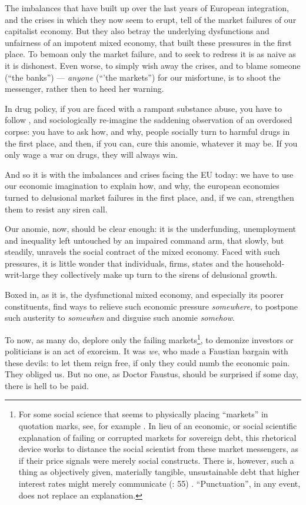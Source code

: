 \documentclass[11pt,a4paper,oneside,openright]{article}
\begin{document}
The imbalances that have built up over the last years of European integration, and the crises in which they now seem to erupt, tell of the market failures of our capitalist economy. But they also betray the underlying dysfunctions and unfairness of an impotent mixed economy, that built these pressures in the first place. To bemoan only the market failure, and to seek to redress it is as naive as it is dishonest. Even worse, to simply wish away the crises, and to blame someone (``the banks'') --- \emph{anyone} (``'the markets'') for our misfortune, is to shoot the messenger, rather then to heed her warning.

In drug policy, if you are faced with a rampant substance abuse, you have to follow \cite{Mills-1959-aa}, and sociologically re-imagine the saddening observation of an overdosed corpse: you have to ask how, and why, people socially turn to harmful drugs in the first place, and then, if you can, cure this anomie, whatever it may be. If you only wage a war on drugs, they will always win.

And so it is with the imbalances and crises facing the \gls{EU} today: we have to use our economic imagination to explain how, and why, the european economies turned to delusional market failures in the first place, and, if we can, strengthen them to resist any siren call. 

Our anomie, now, should be clear enough: it is the underfunding, unemployment and inequality left untouched by an impaired command arm, that slowly, but steadily, unravels the social contract of the mixed economy. Faced with such pressures, it is little wonder that individuals, firms, states and the household-writ-large they collectively make up turn to the sirens of delusional growth.

Boxed in, as it is, the dysfunctional mixed economy, and especially its poorer constituents, find ways to relieve such economic pressure \emph{somewhere}, to postpone such austerity to \emph{somewhen} and disguise such anomie \emph{somehow}. 

To now, as many do, deplore only the failing markets\footnote{
	For some social science that seems to physically placing ``markets'' in quotation marks, see, for example \citealt{Beckert2012}. In lieu of an economic, or social scientific explanation of failing or corrupted markets for sovereign debt, this rhetorical device works to distance the social scientist from these market messengers, as if their price signals were merely social constructs. There is, however, such a thing as objectively given, materially tangible, unsustainable debt that higher interest rates might merely communicate (\citealt{Wihlborg2010}: 55) . ``Punctuation'', in any event, does not replace an explanation.}, 
to demonize investors or politicians is an act of exorcism. It was \emph{we}, who made a Faustian bargain with these devils: to let them reign free, if only they could numb the economic pain. They obliged us. But no one, as Doctor Faustus, should be surprised if some day, there is hell to be paid.
\end{document}
